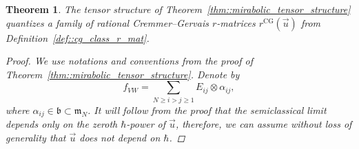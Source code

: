 \documentclass[10pt,a4paper]{amsart}
\numberwithin{equation}{section}
\newtheorem{Theorem}{Theorem}[section]
\newcommand{\CG}{\mathrm{CG}}
\renewcommand{\b}{\mathfrak{b}}
\newcommand{\m}{\mathfrak{m}}
\begin{document}
	\begin{Theorem}
		\label{eq::cg_quantization}
		The tensor structure of Theorem~{\rm\ref{thm::mirabolic_tensor_structure}} quantizes a family of rational Cremmer--Gervais $r$-matrices $r^{\CG}(\vec{u})$ from Definition~{\rm\ref{def::cg_class_r_mat}}.

		\begin{proof}
			We use notations and conventions from the proof of Theorem~\ref{thm::mirabolic_tensor_structure}. Denote by
			\[
			f_{VW} = \sum\limits_{N \geq i > j \geq 1} E_{ij} \otimes \alpha_{ij},
			\]
			where $\alpha_{ij} \in \b \subset \m_N$. It will follow from the proof that the semiclassical limit depends only on the zeroth $\hbar$-power of $\vec{u}$, therefore, we can assume without loss of generality that $\vec{u}$ does not depend on $\hbar$.
			

\end{proof}
\end{Theorem}
\end{document}
